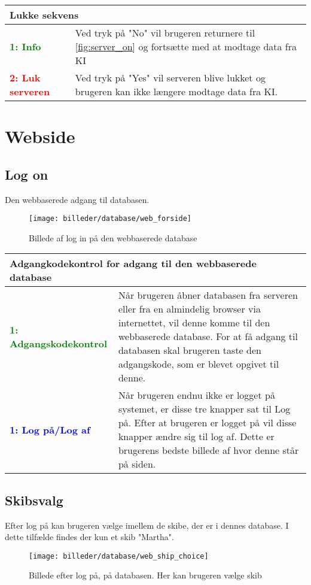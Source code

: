 \begin{table}[H]
\begin{tabular}{l p{12.5cm}}
\multicolumn{2}{l}{Lukke sekvens} \\
\hline
\textcolor{green}{\textbf{1: Info}}
&Ved tryk på "No" vil brugeren returnere til \ref{fig:server_on} og fortsætte med at modtage data fra KI\\

\textcolor{red}{\textbf{2: Luk serveren}}
&Ved tryk på "Yes" vil serveren blive lukket og brugeren kan ikke længere modtage data fra KI.\\

\end{tabular}
\end{table}


\section*{Webside}
\subsection*{Log on}
Den webbaserede adgang til databasen.
\begin{figure}[H]
	\centering
	\texttt{[image: billeder/database/web\_forside]}
	\caption{Billede af log in på den webbaserede database}
	\label{fig:web_pass}
\end{figure}

\begin{table}[H]
\begin{tabular}{l p{12.5cm}}
\multicolumn{2}{l}{Adgangkodekontrol for adgang til den webbaserede database } \\
\hline
\textcolor{green}{\textbf{1: Adgangskodekontrol}}
&Når brugeren åbner databasen fra serveren eller fra en almindelig browser via internettet, vil denne komme til den webbaserede database. For at få adgang til databasen skal brugeren taste den adgangskode, som er blevet opgivet til denne.\\
\textcolor{blue}{\textbf{1: Log på/Log af}}
&Når brugeren endnu ikke er logget på systemet, er disse tre knapper sat til Log på. Efter at brugeren er logget på vil disse knapper ændre sig til log af. Dette er brugerens bedste billede af hvor denne står på siden.
\end{tabular}
\end{table}

\subsection*{Skibsvalg}
Efter log på kan brugeren vælge imellem de skibe, der er i dennes database. I dette tilfælde findes der kun et skib "Martha".
\begin{figure}[H]
	\centering
	\texttt{[image: billeder/database/web\_ship\_choice]}
	\caption{Billede efter log på, på databasen. Her kan brugeren vælge skib}
	\label{fig:web_ship_choice}
\end{figure}

